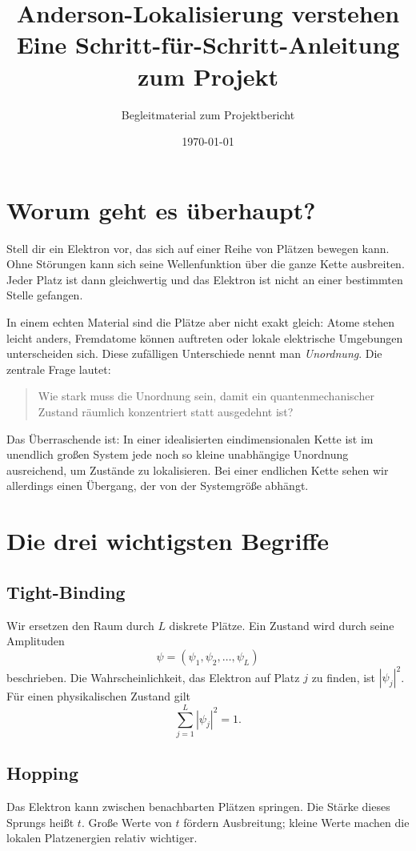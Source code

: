 \documentclass[11pt,a4paper]{article}
\title{Anderson-Lokalisierung verstehen\\
\large Eine Schritt-für-Schritt-Anleitung zum Projekt}
\author{Begleitmaterial zum Projektbericht}
\date{\today}
\begin{document}
\maketitle
\tableofcontents

\section{Worum geht es überhaupt?}
Stell dir ein Elektron vor, das sich auf einer Reihe von Plätzen bewegen kann.
Ohne Störungen kann sich seine Wellenfunktion über die ganze Kette
ausbreiten. Jeder Platz ist dann gleichwertig und das Elektron ist nicht an
einer bestimmten Stelle gefangen.

In einem echten Material sind die Plätze aber nicht exakt gleich: Atome
stehen leicht anders, Fremdatome können auftreten oder lokale elektrische
Umgebungen unterscheiden sich. Diese zufälligen Unterschiede nennt man
\emph{Unordnung}. Die zentrale Frage lautet:
\begin{quote}
 Wie stark muss die Unordnung sein, damit ein quantenmechanischer Zustand
 räumlich konzentriert statt ausgedehnt ist?
\end{quote}
Das Überraschende ist: In einer idealisierten eindimensionalen Kette ist im
unendlich großen System jede noch so kleine unabhängige Unordnung ausreichend,
um Zustände zu lokalisieren. Bei einer endlichen Kette sehen wir allerdings
einen Übergang, der von der Systemgröße abhängt.

\section{Die drei wichtigsten Begriffe}
\subsection{Tight-Binding}
Wir ersetzen den Raum durch $L$ diskrete Plätze. Ein Zustand wird durch seine
Amplituden
\[
 \psi=(\psi_1,\psi_2,\ldots,\psi_L)
\]
beschrieben. Die Wahrscheinlichkeit, das Elektron auf Platz $j$ zu finden,
ist $|\psi_j|^2$. Für einen physikalischen Zustand gilt
\[
 \sum_{j=1}^L|\psi_j|^2=1.
\]

\subsection{Hopping}
Das Elektron kann zwischen benachbarten Plätzen springen. Die Stärke dieses
Sprungs heißt $t$. Große Werte von $t$ fördern Ausbreitung; kleine Werte
machen die lokalen Platzenergien relativ wichtiger.
\end{document}
